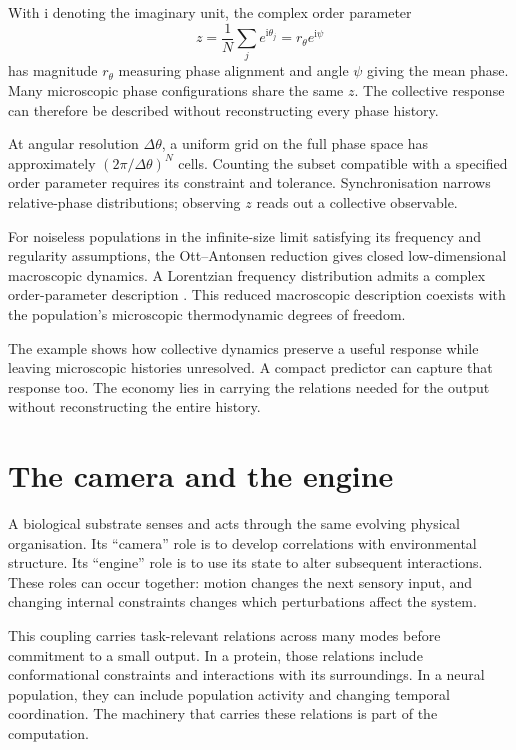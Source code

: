 \documentclass[10pt,a4paper,twocolumn]{article}
\numberwithin{equation}{section}
\begin{document}
With $\mathrm{i}$ denoting the imaginary unit, the complex order parameter
\begin{equation}
z=\frac{1}{N}\sum_j e^{\mathrm{i}\theta_j}
=r_\theta e^{\mathrm{i}\psi}
\end{equation}
has magnitude $r_\theta$ measuring phase alignment and angle $\psi$ giving the mean phase. Many microscopic phase configurations share the same $z$. The collective response can therefore be described without reconstructing every phase history.

At angular resolution $\Delta\theta$, a uniform grid on the full phase space has approximately $(2\pi/\Delta\theta)^N$ cells. Counting the subset compatible with a specified order parameter requires its constraint and tolerance. Synchronisation narrows relative-phase distributions; observing $z$ reads out a collective observable.

For noiseless populations in the infinite-size limit satisfying its frequency and regularity assumptions, the Ott--Antonsen reduction gives closed low-dimensional macroscopic dynamics. A Lorentzian frequency distribution admits a complex order-parameter description \cite{ott2008,ott2009}. This reduced macroscopic description coexists with the population's microscopic thermodynamic degrees of freedom.

The example shows how collective dynamics preserve a useful response while leaving microscopic histories unresolved. A compact predictor can capture that response too. The economy lies in carrying the relations needed for the output without reconstructing the entire history.

\section{The camera and the engine}

A biological substrate senses and acts through the same evolving physical organisation. Its ``camera'' role is to develop correlations with environmental structure. Its ``engine'' role is to use its state to alter subsequent interactions. These roles can occur together: motion changes the next sensory input, and changing internal constraints changes which perturbations affect the system.

This coupling carries task-relevant relations across many modes before commitment to a small output. In a protein, those relations include conformational constraints and interactions with its surroundings. In a neural population, they can include population activity and changing temporal coordination. The machinery that carries these relations is part of the computation.
\end{document}
